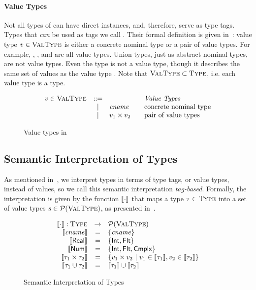 \paragraph{Value Types}
Not all types of \BetaJulia can have direct instances, and, therefore,
serve as type tags. Types that \emph{can} be used as tags we call 
. 
Their formal definition is given in~:
value type $v \in \textsc{ValType}$ is either a concrete nominal type 
or a pair of value types. 
For example, \tyflt, \typair{\tyint}{\tyint},
and \typair{\tystr}{(\typair{\tyint}{\tyint})} are all value types.
Union types, just as abstract nominal types, are not value types.
Even the type \tyunion{\tyint}{\tyint} is not a value type, 
though it describes the same set of values as the value type \tyint.
Note that $\textsc{ValType} \subset \textsc{Type}$, i.e. each value type is a type.

\begin{figure}
	\[
	\begin{array}{rcl@{\qquad}l}
	\vty \in \VType & ::= & & \text{\emph{Value Types}}
	\\ &\Alt& \cname & \text{concrete nominal type}
	\\ &\Alt& \typair{\vty_1}{\vty_2} & \text{pair of value types}
	\end{array}
	\]
	\caption{Value types in \BetaJulia}
	\label{fig:bjsem-value-types}
\end{figure}


\subsection{Semantic Interpretation of Types}

As mentioned in~, 
we interpret types in terms of type tags, or value types, instead of values,
so we call this semantic interpretation \emph{tag-based}.
Formally, the interpretation is given by the function
$\llbracket \cdot \rrbracket$ that maps a type $\tau \in \textsc{Type}$
into a set of value types $s \in \mathcal{P}(\textsc{ValType})$,
as presented in~.

\begin{figure}
	\[
	\begin{array}{rcl}
	\llbracket \cdot \rrbracket: \textsc{Type} &\rightarrow& \mathcal{P}(\textsc{ValType}) \\
	\llbracket \mathit{cname} \rrbracket  & = & \{\mathit{cname}\} \\
	\llbracket \mathsf{Real} \rrbracket & = & \{ \mathsf{Int}, \mathsf{Flt} \} \\
	\llbracket \mathsf{Num} \rrbracket & = & \{ \mathsf{Int}, \mathsf{Flt}, \mathsf{Cmplx} \} \\
	\llbracket \tau_1 \times \tau_2 \rrbracket & = & \{v_1 \times v_2 
	~\vert~ v_1 \in \llbracket \tau_1 \rrbracket, v_2 \in \llbracket \tau_2 \rrbracket\}\\
	\llbracket \tau_1 \cup \tau_2 \rrbracket & = & 
	\llbracket \tau_1 \rrbracket \cup \llbracket \tau_2 \rrbracket
	\end{array}
	\]
	\caption{Semantic Interpretation of \BetaJulia Types}
	\label{fig:bjsem-interpretation}
\end{figure}

